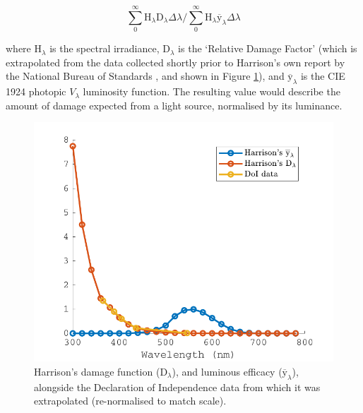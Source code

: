 \begin{equation}
    \sum_{0}^{\infty} \mathrm{H}_{\lambda} \mathrm{D}_{\lambda} \Delta \lambda / \sum_{0}^{\infty} \mathrm{H}_{\lambda} \overline{\mathrm{y}}_{\lambda} \Delta \lambda
    \label{eq:Harrison}
\end{equation}

where $\mathrm{H}_{\lambda}$ is the spectral irradiance, $\mathrm{D}_{\lambda}$ is the `Relative Damage Factor' (which is extrapolated from the data collected shortly prior to Harrison's own report by the National Bureau of Standards \citep{national_bureau_of_standards_preservation_1951}, and shown in Figure \ref{fig:Harrison}), and $\overline{\mathrm{y}}_{\lambda}$ is the \gls{CIE} 1924 photopic $V_{\lambda}$ luminosity function. The resulting value would describe the amount of damage expected from a light source, normalised by its luminance.

\begin{figure}[htbp]
\includegraphics[max width=\textwidth]{figs/LitRev/HarrisonAndDoI.pdf}
\caption{Harrison's \citep{harrison_report_1953} damage function ($\mathrm{D}_{\lambda}$), and luminous efficacy ($\overline{\mathrm{y}}_{\lambda}$), alongside the Declaration of Independence data \citep{national_bureau_of_standards_preservation_1951} from which it was extrapolated (re-normalised to match scale).}
\label{fig:Harrison}
\end{figure}

